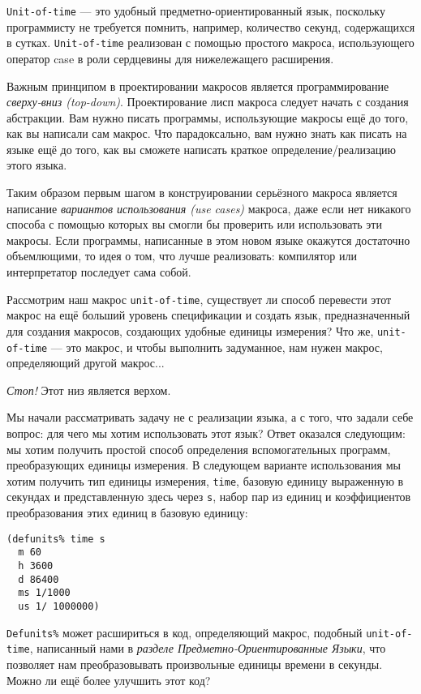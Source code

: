 \verb"Unit-of-time" --- это удобный предметно-ориентированный язык, поскольку программисту не требуется помнить, например, количество секунд, содержащихся в сутках. \verb"Unit-of-time" реализован с помощью простого макроса, использующего оператор case в роли сердцевины для нижележащего расширения.

Важным принципом в проектировании макросов является программирование \emph{сверху-вниз (top-down)}. Проектирование лисп макроса следует начать с создания абстракции. Вам нужно писать программы, использующие макросы ещё до того, как вы написали сам макрос. Что парадоксально, вам нужно знать как писать на языке ещё до того, как вы сможете написать краткое определение/реализацию этого языка.

Таким образом первым шагом в конструировании серьёзного макроса является написание \emph{вариантов использования (use cases)} макроса, даже если нет никакого способа с помощью которых вы смогли бы проверить или использовать эти макросы. Если программы, написанные в этом новом языке окажутся достаточно объемлющими, то идея о том, что лучше реализовать: компилятор или интерпретатор последует сама собой.

Рассмотрим наш макрос \verb"unit-of-time", существует ли способ перевести этот макрос на ещё больший уровень спецификации и создать язык, предназначенный для создания макросов, создающих удобные единицы измерения? Что же, \verb"unit-of-time" --- это макрос, и чтобы выполнить задуманное, нам нужен макрос, определяющий другой макрос...

\emph{Стоп!} Этот низ является верхом.

Мы начали рассматривать задачу не с реализации языка, а с того, что задали себе вопрос: для чего мы хотим использовать этот язык? Ответ оказался следующим: мы хотим получить простой способ определения вспомогательных программ, преобразующих единицы измерения. В следующем варианте использования мы хотим получить тип единицы измерения, \verb"time", базовую единицу выраженную в секундах и представленную здесь через \verb"s", набор пар из единиц и коэффициентов преобразования этих единиц в базовую единицу:

\begin{verbatim}
(defunits% time s
  m 60
  h 3600
  d 86400
  ms 1/1000
  us 1/ 1000000)
\end{verbatim}

\verb"Defunits%" может расшириться в код, определяющий макрос, подобный \verb"unit-of-time", написанный нами в \emph{разделе Пред\-мет\-но-Ориен\-ти\-ро\-ван\-ные Языки}, что позволяет нам преобразовывать произвольные единицы времени в секунды. Можно ли ещё более улучшить этот код?

